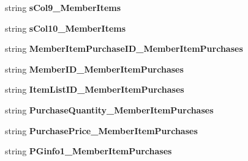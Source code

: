 \begin{DoxyCompactItemize}
\item 
string {\bfseries s\+Col9\+\_\+\+Member\+Items}\hypertarget{a00118_a31a3980768ef187a25f20ed397404ca6}{}\label{a00118_a31a3980768ef187a25f20ed397404ca6}

\item 
string {\bfseries s\+Col10\+\_\+\+Member\+Items}\hypertarget{a00118_a300ced30f3dd5e880f88a27de28ff863}{}\label{a00118_a300ced30f3dd5e880f88a27de28ff863}

\item 
string {\bfseries Member\+Item\+Purchase\+I\+D\+\_\+\+Member\+Item\+Purchases}\hypertarget{a00118_a5b34d2e0c9454ca998fc75fdb458e12c}{}\label{a00118_a5b34d2e0c9454ca998fc75fdb458e12c}

\item 
string {\bfseries Member\+I\+D\+\_\+\+Member\+Item\+Purchases}\hypertarget{a00118_a9b5100f7cc0402e276a6ae9d46ccd87b}{}\label{a00118_a9b5100f7cc0402e276a6ae9d46ccd87b}

\item 
string {\bfseries Item\+List\+I\+D\+\_\+\+Member\+Item\+Purchases}\hypertarget{a00118_a9fd4580638dfddc1a0f97ad1b40a94b1}{}\label{a00118_a9fd4580638dfddc1a0f97ad1b40a94b1}

\item 
string {\bfseries Purchase\+Quantity\+\_\+\+Member\+Item\+Purchases}\hypertarget{a00118_a3a99ea5728bcd3d35ba5d00dee90db88}{}\label{a00118_a3a99ea5728bcd3d35ba5d00dee90db88}

\item 
string {\bfseries Purchase\+Price\+\_\+\+Member\+Item\+Purchases}\hypertarget{a00118_a6dd07614d130c6c640f5fea4bf13ad34}{}\label{a00118_a6dd07614d130c6c640f5fea4bf13ad34}

\item 
string {\bfseries P\+Ginfo1\+\_\+\+Member\+Item\+Purchases}\hypertarget{a00118_aa25335599b04508d7f9e729c299a4a59}{}\label{a00118_aa25335599b04508d7f9e729c299a4a59}


\end{DoxyCompactItemize}
